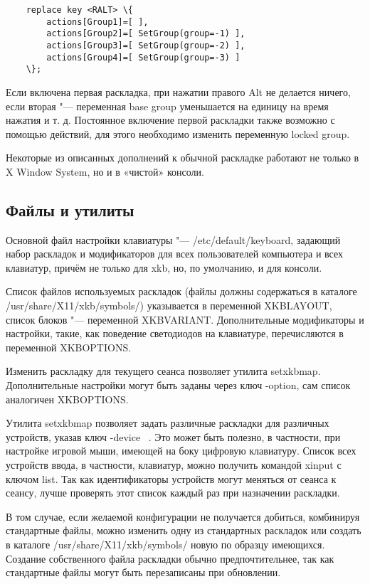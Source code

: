\documentclass[10pt, a5paper]{article}
\begin{document}
\begin{verbatim}
    replace key <RALT> \{
        actions[Group1]=[ ],
        actions[Group2]=[ SetGroup(group=-1) ],
        actions[Group3]=[ SetGroup(group=-2) ],
        actions[Group4]=[ SetGroup(group=-3) ]
    \};
\end{verbatim}

Если включена первая раскладка, при нажатии правого Alt не делается ничего, если вторая "--- переменная base group уменьшается на единицу на время нажатия и т. д. Постоянное включение первой раскладки также возможно с помощью действий, для этого необходимо изменить переменную locked group. 

Некоторые из описанных дополнений к обычной раскладке работают не только в X Window System, но и в «чистой» консоли.

\subsection*{Файлы и утилиты}

Основной файл настройки клавиатуры "--- /etc/default/keyboard, задающий набор раскладок и модификаторов для всех пользователей компьютера и всех клавиатур, причём не только для xkb, но, по умолчанию, и для консоли.

Список файлов используемых раскладок (файлы должны содержаться в каталоге /usr/share/X11/xkb/symbols/) указывается в переменной \linebreak XKBLAYOUT, список блоков "--- переменной XKBVARIANT. Дополнительные модификаторы и настройки, такие, как поведение светодиодов на клавиатуре, перечисляются в переменной XKBOPTIONS.

Изменить раскладку для текущего сеанса позволяет утилита setxkbmap. Дополнительные настройки могут быть заданы через ключ -option, сам список аналогичен XKBOPTIONS.

Утилита setxkbmap позволяет задать различные раскладки для различных устройств, указав ключ -device ~\cite{Kononova2}. Это может быть полезно, в частности, при настройке игровой мыши, имеющей на боку цифровую клавиатуру. Список всех устройств ввода, в частности, клавиатур, можно получить командой  xinput с ключом list. Так как идентификаторы устройств могут меняться от сеанса к сеансу, лучше проверять этот список каждый раз при назначении раскладки.

В том случае, если желаемой конфигурации не получается добиться, комбинируя стандартные файлы, можно изменить одну из стандартных раскладок или создать в каталоге \linebreak /usr/share/X11/xkb/symbols/ новую по образцу имеющихся. Создание собственного файла раскладки обычно предпочтительнее, так как стандартные файлы могут быть перезаписаны при обновлении.
\end{document}
